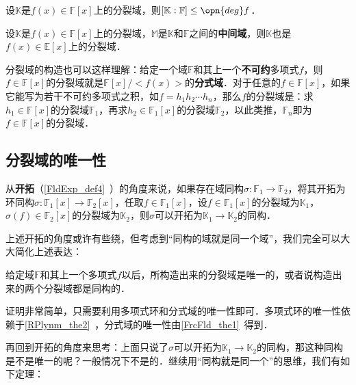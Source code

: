 \begin{corollary}{}
设$\mathbb{K}$是$f(x)\in \mathbb{F}[x]$上的分裂域，则$[\mathbb{K}:\mathbb{F}]\leq \opn{deg}f$．
\end{corollary}

\begin{corollary}{}
设$\mathbb{K}$是$f(x)\in \mathbb{F}[x]$上的分裂域，$\mathbb{M}$是$\mathbb{K}$和$\mathbb{F}$之间的\textbf{中间域}，则$\mathbb{K}$也是$f(x)\in \mathbb{E}[x]$上的分裂域．
\end{corollary}


分裂域的构造也可以这样理解：给定一个域$\mathbb{F}$和其上一个\textbf{不可约}多项式$f$，则$f\in\mathbb{F}[x]$的分裂域就是$\mathbb{F}[x]/<f(x)>$的\textbf{分式域}．对于任意的$f\in\mathbb{F}[x]$，如果它能写为若干不可约多项式之积，如$f=h_1h_2\cdots h_n$，那么$f$的分裂域是：求$h_1\in\mathbb{F}[x]$的分裂域$\mathbb{F}_1$，再求$h_2\in\mathbb{F}_1[x]$的分裂域$\mathbb{F}_2$，以此类推，$\mathbb{F}_n$即为$f\in\mathbb{F}[x]$的分裂域．










\subsection{分裂域的唯一性}

从\textbf{开拓}（\autoref{FldExp_def4}~）的角度来说，如果存在域同构$\sigma:\mathbb{F}_1\to\mathbb{F}_2$，将其开拓为环同构$\sigma:\mathbb{F}_1[x]\to\mathbb{F}_2[x]$，任取$f\in\mathbb{F}_1[x]$，设$f\in\mathbb{F}_1[x]$的分裂域为$\mathbb{K}_1$，$\sigma(f)\in\mathbb{F}_2[x]$的分裂域为$\mathbb{K}_2$，则$\sigma$可以开拓为$\mathbb{K}_1\to\mathbb{K}_2$的同构．

上述开拓的角度或许有些绕，但考虑到“同构的域就是同一个域”，我们完全可以大大简化上述表达：

\begin{theorem}{}
给定域$\mathbb{F}$和其上一个多项式$f$以后，所构造出来的分裂域是唯一的，或者说构造出来的两个分裂域都是同构的．
\end{theorem}

证明非常简单，只需要利用多项式环和分式域的唯一性即可．多项式环的唯一性依赖于\autoref{RPlynm_the2}~，分式域的唯一性由\autoref{FrcFld_the1}~得到．

再回到开拓的角度来思考：上面只说了$\sigma$可以开拓为$\mathbb{K}_1\to\mathbb{K}_2$的同构，那这种同构是不是唯一的呢？一般情况下不是的．继续用“同构就是同一个”的思维，我们有如下定理：

